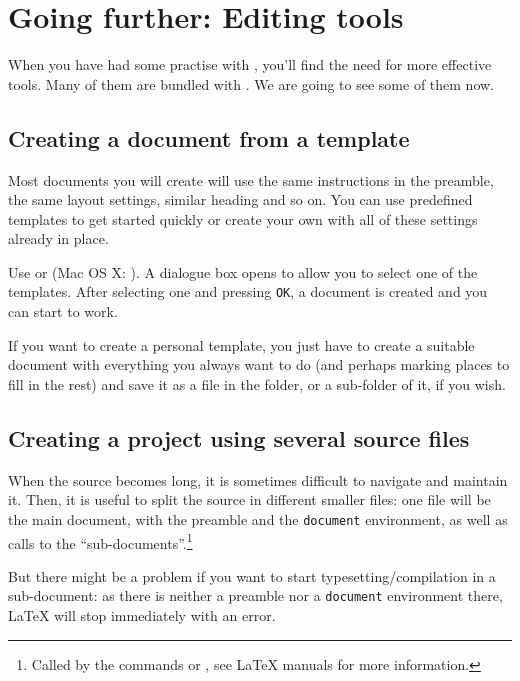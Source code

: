 
\chapter{Going further: Editing tools}

When you have had some practise with {\Tw}, you'll find the need for more effective tools. Many of them are bundled with {\Tw}. We are going to see some of them now.

\section{Creating a document from a template}

Most documents you will create will use the same instructions in the preamble, the same layout settings, similar heading and so on. You can use predefined templates to get started quickly or create your own with all of these settings already in place.

Use \submenu{} or  (Mac OS X: ). A dialogue box opens to allow you to select one of the templates. After selecting one and pressing \verb|OK|, a document is created and you can start to work.

If you want to create a personal template, you just have to create a suitable document with everything you always want to do (and perhaps marking places to fill in the rest) and save it as a  file in the  folder, or a sub-folder of it, if you wish.

\section{Creating a project using several source files}

When the source becomes long, it is sometimes difficult to navigate and maintain it. Then, it is useful to split the source in different smaller files: one file will be the main document, with the preamble and the \verb|document| environment, as well as calls to the ``sub-documents''.\footnote{Called by the commands
\verb|| or \verb||, see {\LaTeX} manuals for more information.}

But there might be a problem if you want to start typesetting/compilation in a sub-document: as there is neither a preamble nor a \verb|document| environment there, {\LaTeX} will stop immediately with an error.

